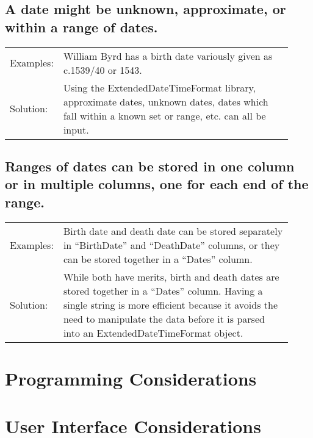\documentclass[letterpaper]{report}
\begin{document}
\section{A date might be unknown, approximate, or within a range of dates.}

\begin{tabular}{ p{0.1\linewidth} p{0.825\linewidth} }

Examples: & 

William Byrd has a birth date variously given as c.1539/40 or 1543. \\ 
  
Solution: & 

Using the ExtendedDateTimeFormat library, approximate dates, unknown dates, dates which fall within a known set or range, etc. can all be input. \\
  
\end{tabular}

\section{Ranges of dates can be stored in one column or in multiple columns, one for each end of the range.}

\begin{tabular}{ p{0.1\linewidth} p{0.825\linewidth} }

Examples: & 

Birth date and death date can be stored separately in ``BirthDate'' and ``DeathDate'' columns, or they can be stored together in a ``Dates'' column. \\ 
  
Solution: & 

While both have merits, birth and death dates are stored together in a ``Dates'' column. Having a single string is more efficient because it avoids the need to manipulate the data before it is parsed into an ExtendedDateTimeFormat object. \\
  
\end{tabular}

\chapter{Programming Considerations}

\chapter{User Interface Considerations}
\end{document}
